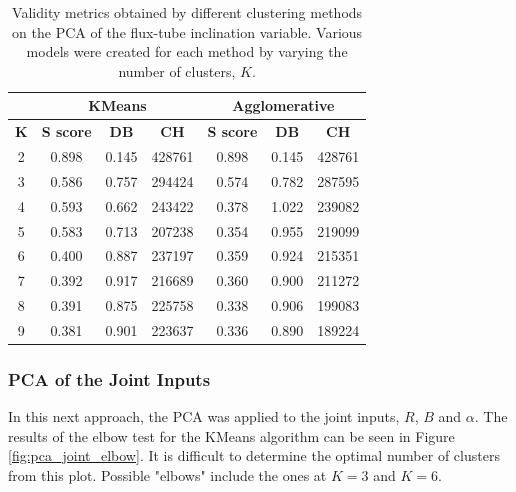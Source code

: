 \begin{table}[h]
    \caption[Validity metrics for PCA of the Flux-tube Inclination]{Validity metrics obtained by different clustering methods on the PCA of the flux-tube inclination variable. Various models were created for each method by varying the number of clusters, $K$.}\label{tab:pca_a}
    \begin{tabular}{@{}cccc|ccc@{}}
    \cmidrule(l){2-7}
    \multicolumn{1}{l}{}            & \multicolumn{3}{c|}{\textbf{KMeans}}         & \multicolumn{3}{c}{\textbf{Agglomerative}}   \\ \midrule
    \multicolumn{1}{c|}{\textbf{K}} & \textbf{S score} & \textbf{DB} & \textbf{CH} & \textbf{S score} & \textbf{DB} & \textbf{CH} \\ \midrule
    \multicolumn{1}{c|}{2}          & 0.898            & 0.145       & 428761  & 0.898            & 0.145       & 428761  \\
    \multicolumn{1}{c|}{3}          & 0.586            & 0.757       & 294424  & 0.574            & 0.782       & 287595  \\
    \multicolumn{1}{c|}{4}          & 0.593            & 0.662       & 243422  & 0.378            & 1.022       & 239082  \\
    \multicolumn{1}{c|}{5}          & 0.583            & 0.713       & 207238  & 0.354            & 0.955       & 219099  \\
    \multicolumn{1}{c|}{6}          & 0.400            & 0.887       & 237197  & 0.359            & 0.924       & 215351  \\
    \multicolumn{1}{c|}{7}          & 0.392            & 0.917       & 216689  & 0.360            & 0.900       & 211272  \\
    \multicolumn{1}{c|}{8}          & 0.391            & 0.875       & 225758  & 0.338            & 0.906       & 199083  \\
    \multicolumn{1}{c|}{9}          & 0.381            & 0.901       & 223637  & 0.336            & 0.890       & 189224  \\ \bottomrule
    \end{tabular}
    \end{table}

\subsubsection{PCA of the Joint Inputs}\label{sec:pca_joint}
In this next approach, the PCA was applied to the joint inputs, $R$, $B$ and $\alpha$. The results of the elbow test for the KMeans algorithm can be seen in Figure \ref{fig:pca_joint_elbow}. It is difficult to determine the optimal number of clusters from this plot. Possible "elbows" include the ones at $K=3$ and $K=6$.

